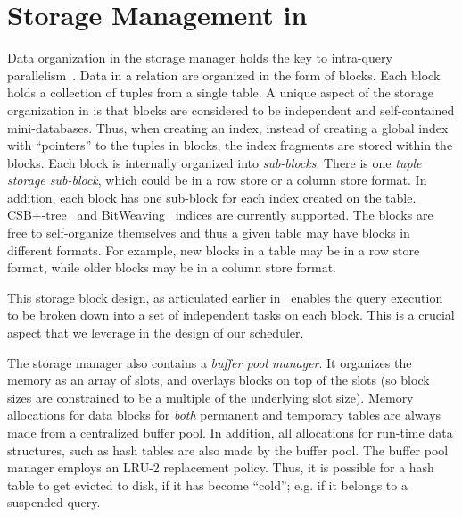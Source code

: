 \section{Storage Management in \sys{}}\label{sec:storage-manager}
Data organization in the \sys{} storage manager holds the key to intra-query 
parallelism~\cite{qsstorage}. 
Data in a relation are organized in the form of blocks. 
Each block holds a collection of tuples from a single table. 
A unique aspect of the storage organization in \sys{} is that blocks are considered to 
be independent and self-contained mini-databases. 
Thus, when creating an index, instead of creating a global index with 
``pointers'' to the tuples in blocks, the index fragments are stored within the blocks. 
Each block is internally organized into \textit{sub-blocks}. 
There is one \textit{tuple storage sub-block}, which could be in a row store or a 
column store format.
In addition, each block has one sub-block for each index created on the table. 
CSB+-tree~\cite{csb+-tree} and BitWeaving~\cite{bitweaving} 
indices are currently supported. 
The blocks are free to self-organize themselves and thus a given table may have blocks in different formats. 
For example, new blocks in a table may be in a row store format, while older blocks may 
be in a column store format.

This storage block design, as articulated earlier in~\cite{qsstorage} enables the query execution to be broken down into a set of independent tasks on each block. 
This is a crucial aspect that we leverage in the design of our scheduler. 

The storage manager also contains a \textit{buffer pool manager}. 
It organizes the memory as an array of slots, and overlays blocks on top of the slots (so block sizes are constrained to be a multiple of the underlying slot size). 
Memory allocations for data blocks for \textit{both} permanent and temporary tables are always made from a centralized buffer pool. 
In addition, all allocations for run-time data structures, such as hash tables are also made 
by the buffer pool. 
The buffer pool manager employs an LRU-2 replacement policy. 
Thus, it is possible for a hash table to get evicted to disk, if it has become ``cold''; e.g. if it belongs to a suspended query.


